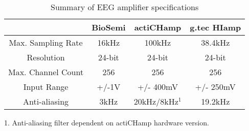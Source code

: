 \begin{table}[]
\centering
\caption{Summary of EEG amplifier specifications} 
\label{tableeeg}
\begin{tabular}{|c|c|c|c|}
\hline
\textbf{}          & \textbf{BioSemi} & \textbf{actiCHamp} & \textbf{g.tec HIamp} \\ \hline
Max. Sampling Rate & 16kHz            & 100kHz             & 38.4kHz              \\ \hline
Resolution         & 24-bit           & 24-bit             & 24-bit               \\ \hline
Max. Channel Count      & 256              & 256                & 256                  \\ \hline
Input Range      & +/-1V            & +/- 400mV          & +/- 250mV            \\ \hline
Anti-aliasing      & 3kHz             & 20kHz/8kHz$^{1}$         &  19.2kHz      \\ \hline
\end{tabular}
\end{table}

1. Anti-aliasing filter dependent on actiCHamp hardware version.